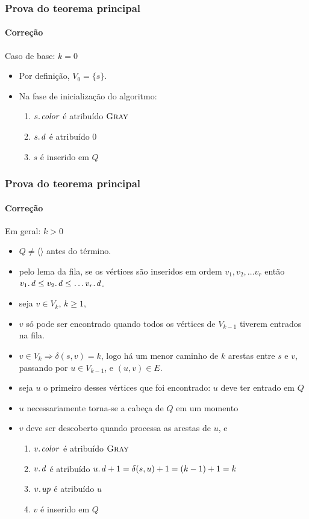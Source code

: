 \documentclass{beamer}
\begin{document}
\begin{frame}
\frametitle{Prova do teorema principal}
\framesubtitle{Correção}

Caso de base: $k = 0$

\begin{itemize}

\item Por definição, $V_0 = \{ s \}$. 

\item Na fase de inicialização do algoritmo:

\begin{enumerate}
\item $\attrib{s}{color}$ é atribuído $\textnormal{\scshape Gray}$
\item $\attrib{s}{d}$ é atribuído $0$
\item $s$ é inserido em $Q$
\end{enumerate}

\end{itemize}
\end{frame}

\begin{frame}
\frametitle{Prova do teorema principal}
\framesubtitle{Correção}

Em geral: $k > 0$

\begin{itemize}
\item $Q \neq \langle \rangle$ antes do término.
\item pelo lema da fila, se os vértices são inseridos em ordem $v_1, v_2, \ldots v_r$ então
$\attrib{v_1}{d} \le \attrib{v_2}{d} \le \ldots \attrib{v_r}{d}$.
\item seja $v \in V_k$, $k \ge 1$,
\item $v$ só pode ser encontrado quando todos os vértices de $V_{k-1}$ tiverem entrados na fila.
\item $v \in V_k \Rightarrow \delta(s, v) = k$, logo há um menor caminho de $k$ arestas entre $s$ e $v$, passando por $u \in V_{k-1}$, e $(u, v) \in E$.
\item seja $u$ o primeiro desses vértices que foi encontrado: $u$ deve ter entrado em $Q$
\item $u$ necessariamente torna-se a cabeça de $Q$ em um momento
\item $v$ deve ser descoberto quando processa as arestas de $u$, e
\begin{enumerate}
\item $\attrib{v}{color}$ é atribuído $\textnormal{\scshape Gray}$
\item $\attrib{v}{d}$ é atribuído $\attrib{u}{d}+1 = \delta(s, u)+1 = (k-1)+1 =k$
\item $\attrib{v}{up}$ é atribuído $u$
\item $v$ é inserido em $Q$
\end{enumerate}
\end{itemize}

\end{frame}
\end{document}
